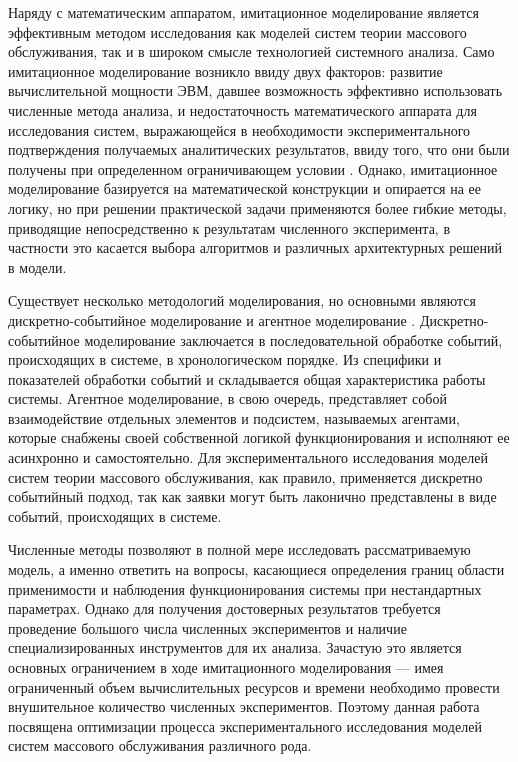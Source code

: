 Наряду с математическим аппаратом, имитационное моделирование \cite{задорожный2011методы} является эффективным методом исследования как моделей систем теории массового обслуживания, так и в широком смысле технологией системного анализа. Само имитационное моделирование возникло ввиду двух факторов: развитие вычислительной мощности ЭВМ, давшее возможность эффективно использовать численные метода анализа, и недостаточность математического аппарата для исследования систем, выражающейся в необходимости экспериментального подтверждения получаемых аналитических результатов, ввиду того, что они были получены при определенном ограничивающем условии \cite{горбунов2007парадигмы}. Однако, имитационное моделирование базируется на математической конструкции и опирается на ее логику, но при решении практической задачи применяются более гибкие методы, приводящие непосредственно к результатам численного эксперимента, в частности это касается выбора алгоритмов и различных архитектурных решений в модели.

Существует несколько методологий моделирования, но основными являются дискретно-событийное моделирование \cite{илюхина2015дискретно,григорьева2014дискретно} и агентное моделирование \cite{лебедюк2017агентное}. Дискретно-событийное моделирование заключается в последовательной обработке событий, происходящих в системе, в хронологическом порядке. Из специфики и показателей обработки событий и складывается общая характеристика работы системы. Агентное моделирование, в свою очередь, представляет собой взаимодействие отдельных элементов и подсистем, называемых агентами, которые снабжены своей собственной логикой функционирования и исполняют ее асинхронно и самостоятельно. Для экспериментального исследования моделей систем теории массового обслуживания, как правило, применяется дискретно событийный подход, так как заявки могут быть лаконично представлены в виде событий, происходящих в системе.

 Численные методы позволяют в полной мере исследовать рассматриваемую модель, а именно ответить на вопросы, касающиеся определения границ области применимости и наблюдения функционирования системы при нестандартных параметрах. Однако для получения достоверных результатов требуется проведение большого числа численных экспериментов и наличие специализированных инструментов для их анализа. Зачастую это является основных ограничением в ходе имитационного моделирования --- имея ограниченный объем вычислительных ресурсов и времени необходимо провести внушительное количество численных экспериментов. Поэтому данная работа посвящена оптимизации процесса экспериментального исследования моделей систем массового обслуживания различного рода. 
 
